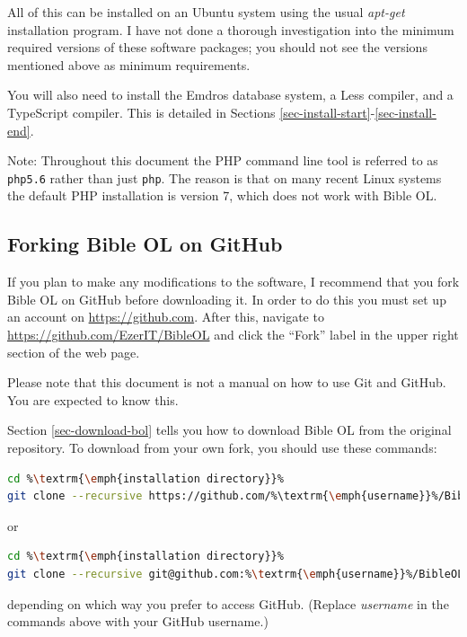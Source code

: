 \documentclass[11pt,oneside,a4paper]{memoir}
\begin{document}
All of this can be installed on an Ubuntu system using the usual \emph{apt-get} installation
program. I have not done a thorough investigation into the minimum required versions of these
software packages; you should not see the versions mentioned above as minimum requirements.

You will also need to install the Emdros database system, a Less compiler, and a TypeScript
compiler. This is detailed in Sections \ref{sec-install-start}-\ref{sec-install-end}.

Note: Throughout this document the PHP command line tool is referred to as \texttt{php5.6}
rather than just \texttt{php}. The reason is that on many recent Linux systems the default PHP
installation is version 7, which does not work with Bible OL.

\subsection{Forking Bible OL on GitHub}\label{sec-fork-github}

If you plan to make any modifications to the software, I recommend that you fork Bible OL on GitHub
before downloading it. In order to do this you must set up an account on \url{https://github.com}.
After this, navigate to \url{https://github.com/EzerIT/BibleOL} and click the ``Fork'' label in the
upper right section of the web page.

Please note that this document is not a manual on how to use Git and GitHub. You are expected to
know this.

Section \ref{sec-download-bol} tells you how to download Bible OL from the original repository. To
download from your own fork, you should use these commands:


\begin{lstlisting}[language=bash]
cd %\textrm{\emph{installation directory}}%
git clone --recursive https://github.com/%\textrm{\emph{username}}%/BibleOL
\end{lstlisting}

\noindent
or

\begin{lstlisting}[language=bash]
cd %\textrm{\emph{installation directory}}%
git clone --recursive git@github.com:%\textrm{\emph{username}}%/BibleOL.git
\end{lstlisting}

\noindent
depending on which way you prefer to access GitHub. (Replace \emph{username} in the commands above
with your GitHub username.)
\end{document}
